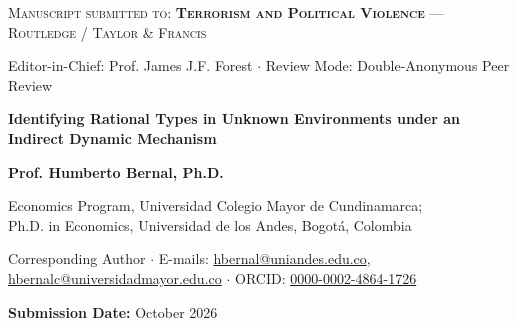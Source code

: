 \documentclass[11pt]{article}
\begin{document}
\singlespacing

\begin{center}
    {\footnotesize\scshape Manuscript submitted to: \textbf{Terrorism and Political Violence} --- Routledge / Taylor \& Francis\par}
    {\scriptsize Editor-in-Chief: Prof. James J.F. Forest \quad $\cdot$ \quad Review Mode: Double-Anonymous Peer Review\par}
    \vspace{0.35cm}
    
    {\Large\bfseries Identifying Rational Types in Unknown Environments under an Indirect Dynamic Mechanism\par}
    
    \vspace{0.35cm}
    
    {\large\textbf{Prof. Humberto Bernal, Ph.D.}\par}
    \vspace{0.12cm}
    {\small Economics Program, Universidad Colegio Mayor de Cundinamarca;\\
    Ph.D. in Economics, Universidad de los Andes, Bogot\'a, Colombia\par}
    \vspace{0.15cm}
    {\footnotesize Corresponding Author $\cdot$ E-mails: \href{mailto:hbernal@uniandes.edu.co}{hbernal@uniandes.edu.co}, \href{mailto:hbernalc@universidadmayor.edu.co}{hbernalc@universidadmayor.edu.co} $\cdot$ ORCID: \href{https://orcid.org/0000-0002-4864-1726}{0000-0002-4864-1726}\par}
    \vspace{0.12cm}
    {\footnotesize\textbf{Submission Date:} October 2026\par}
\end{center}

\vspace{0.2cm}

\begin{abstract}
\noindent This paper develops an indirect dynamic mechanism to identify rational types in unknown environments characterized by observational pooling and asymmetric information. The central theoretical contribution establishes the Rational Type Identification Theorem, proving that the principal's Bayesian posterior beliefs converge almost surely to the agent's true latent type along prolonged interactions without direct revelation reports. This asymptotic identification is operationalized by the Mano de Dios--Guadalupe (MDG) process, an endogenous maximum-entropy implementation noise kernel that ensures full support across the decision space within a competing-risks architecture. A complementary Implementability Theorem guarantees sequential execution in Perfect Bayesian Equilibrium. Microeconometric calibration and deep-learning computational simulations of kidnapping for ransom in Colombia validate rapid type separation and policy feasibility across Colombian insurgent groups and criminal syndicates, including the Revolutionary Armed Forces of Colombia (FARC), the National Liberation Army (ELN), paramilitaries (PAR), and common delinquency (DC).
\end{abstract}
\end{document}
